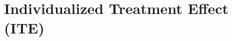 















\section{Individualized Treatment Effect (ITE)} \label{sec:methods_ite}



% 
% 
% 
% 
% 
% 






